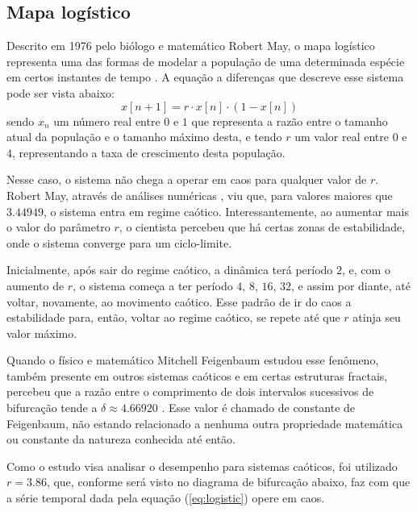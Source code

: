 \documentclass[a4paper, 12pt]{article}
\begin{document}
\subsection{Mapa logístico}

Descrito em 1976 pelo biólogo e matemático Robert May, o mapa logístico representa uma das formas de modelar a população de uma determinada espécie em certos instantes de tempo \cite{may1976simple}. A equação a diferenças que descreve esse sistema pode ser vista abaixo:
\begin{equation}\label{eq:logistic}
x[n+1] = r\cdot x[n] \cdot (1 - x[n])
\end{equation}
sendo $x_n$ um número real entre $0$ e $1$ que representa a razão entre o tamanho atual da população e o tamanho máximo desta, e tendo $r$ um valor real entre $0$ e $4$, representando a taxa de crescimento desta população.

Nesse caso, o sistema não chega a operar em caos para qualquer valor de $r$. Robert May, através de análises numéricas \cite{gleick1998chaos}, viu que, para valores maiores que $3.44949$, o sistema entra em regime caótico. Interessantemente, ao aumentar mais o valor do parâmetro $r$, o cientista percebeu que há certas zonas de estabilidade, onde o sistema converge para um ciclo-limite. 

Inicialmente, após sair do regime caótico, a dinâmica terá período $2$, e, com o aumento de $r$, o sistema começa a ter período $4$, $8$, $16$, $32$, e assim por diante, até voltar, novamente, ao movimento caótico. Esse padrão de ir do caos a estabilidade para, então, voltar ao regime caótico, se repete até que $r$ atinja seu valor máximo.

Quando o físico e matemático Mitchell Feigenbaum estudou esse fenômeno, também presente em outros sistemas caóticos e em certas estruturas fractais, percebeu que a razão entre o comprimento de dois intervalos sucessivos de bifurcação tende a $\delta \approx 4.66920$ \cite{feigenbaum1978quantitative}. Esse valor é chamado de constante de Feigenbaum, não estando relacionado a nenhuma outra propriedade matemática ou constante da natureza conhecida até então.

Como o estudo visa analisar o desempenho para sistemas caóticos, foi utilizado $r=3.86$, que, conforme será visto no diagrama de bifurcação abaixo, faz com que a série temporal dada pela equação (\ref{eq:logistic}) opere em caos. 
\end{document}
